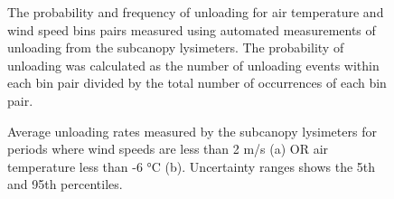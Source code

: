 \documentclass[
  letterpaper,
  DIV=11,
  numbers=noendperiod]{scrartcl}
\begin{document}
\begin{figure}

\begin{minipage}{0.50\linewidth}


\subcaption{\label{fig-prob-unl}}

\end{minipage}%
%
\begin{minipage}{0.50\linewidth}


\subcaption{\label{fig-prob-freq}}

\end{minipage}%

\caption{\label{fig-bin-unl}The probability and frequency of unloading
for air temperature and wind speed bins pairs measured using automated
measurements of unloading from the subcanopy lysimeters. The probability
of unloading was calculated as the number of unloading events within
each bin pair divided by the total number of occurrences of each bin
pair.}

\end{figure}%

\begin{figure}

\begin{minipage}{\linewidth}


\subcaption{\label{fig-qunld-temp}}

\end{minipage}%
\newline
\begin{minipage}{\linewidth}


\subcaption{\label{fig-qunld-wind}}

\end{minipage}%

\caption{\label{fig-qunl-met}Average unloading rates measured by the
subcanopy lysimeters for periods where wind speeds are less than 2 m/s
(a) OR air temperature less than -6 °C (b). Uncertainty ranges shows the
5th and 95th percentiles.}

\end{figure}%
\end{document}
